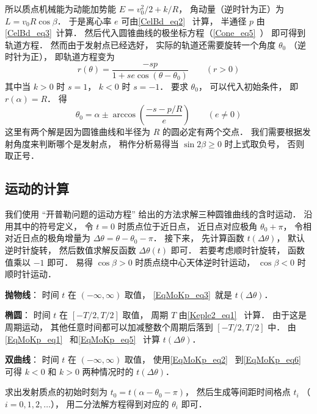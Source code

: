 所以质点机械能为动能加势能 $E = v_0^2/2 + k/R$， 角动量（逆时针为正）为 $L = v_0 R\cos\beta$． 于是离心率 $e$ 可由\autoref{CelBd_eq2}~ 计算， 半通径 $p$ 由\autoref{CelBd_eq3}~计算． 然后代入圆锥曲线的极坐标方程（\autoref{Cone_eq5}~） 即可得到轨道方程． 然而由于发射点已经选好， 实际的轨道还需要旋转一个角度 $\theta_0$ （逆时针为正）， 即轨道方程变为
\begin{equation}\label{KepNum_eq1}
r(\theta)  = \frac{-s p}{1 + s e\cos (\theta-\theta_0)} \qquad (r > 0)
\end{equation}
其中当 $k>0$ 时 $s=1$， $k<0$ 时 $s=-1$． 要求 $\theta_0$， 可以代入初始条件， 即 $r(\alpha) = R$． 得
\begin{equation}
\theta_0 = \alpha \pm \arccos(\frac{-s - p/R}{e}) \qquad (e\ne 0)
\end{equation}
这里有两个解是因为圆锥曲线和半径为 $R$ 的圆必定有两个交点． 我们需要根据发射角度来判断哪个是发射点， 稍作分析易得当 $\sin2\beta \geqslant 0$ 时上式取负号， 否则取正号．

\subsection{运动的计算}


我们使用 “开普勒问题的运动方程” 给出的方法求解三种圆锥曲线的含时运动． 沿用其中的符号定义， 令 $t=0$ 时质点位于近日点，  近日点对应极角 $\theta_0 + \pi$， 令相对近日点的极角增量为 $\Delta\theta = \theta - \theta_0 - \pi$． 接下来， 先计算函数 $t(\Delta\theta)$， 默认逆时针旋转， 然后数值求解反函数 $\Delta\theta(t)$ 即可． 若要考虑顺时针旋转， 函数值乘以 $-1$ 即可． 易得 $\cos\beta > 0$ 时质点绕中心天体逆时针运动， $\cos\beta < 0$ 时顺时针运动．

\textbf{抛物线}： 时间 $t$ 在 $(-\infty,\infty)$ 取值， \autoref{EqMoKp_eq3}~就是 $t(\Delta\theta)$．

\textbf{椭圆}： 时间 $t$ 在 $[-T/2,T/2]$ 取值， 周期 $T$ 由\autoref{Keple2_eq1}~ 计算． 由于这是周期运动， 其他任意时间都可以加减整数个周期后落到 $[-T/2,T/2]$ 中． 由\autoref{EqMoKp_eq1}~ 和\autoref{EqMoKp_eq5}~ 计算 $t(\Delta\theta)$．

\textbf{双曲线}： 时间 $t$ 在 $(-\infty,\infty)$ 取值， 使用\autoref{EqMoKp_eq2}~ 到\autoref{EqMoKp_eq6}~ 可得 $k<0$ 和 $k>0$ 两种情况时的 $t(\Delta\theta)$．

求出发射质点的初始时刻为 $t_0 = t(\alpha - \theta_0 - \pi)$， 然后生成等间距时间格点 $t_i$ （$i=0,1,2,\dots$）， 用二分法解方程得到对应的 $\theta_i$ 即可．

